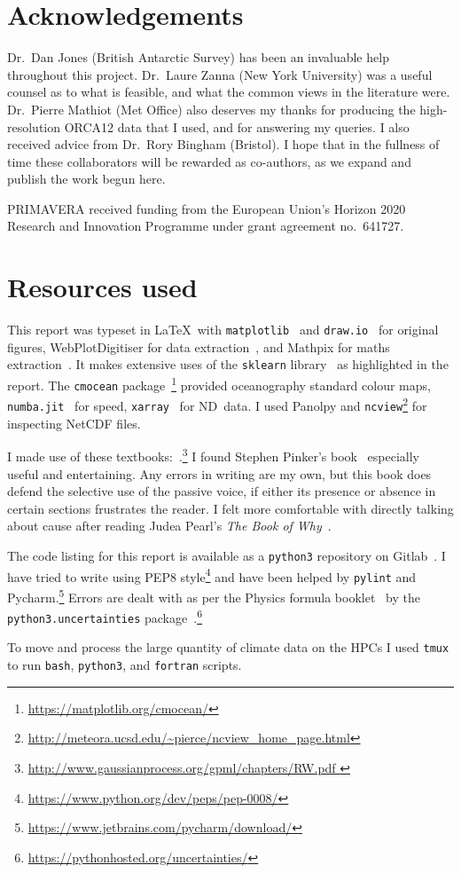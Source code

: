 \section{Acknowledgements}
Dr.\ Dan Jones (British Antarctic Survey) has been an invaluable help throughout this project.
Dr.\ Laure Zanna (New York University) was a useful counsel as to what is feasible,
 and what the common views in the literature were.
Dr.\ Pierre Mathiot (Met Office) also deserves my thanks for
producing the high-resolution ORCA12 data that I used, and
for answering my queries.
I also received advice from Dr.\ Rory Bingham (Bristol).
I hope that in the fullness of time these collaborators will be rewarded
as co-authors, as we expand and publish the
work begun here.

PRIMAVERA received funding from the European Union's Horizon 2020
Research and Innovation Programme under grant agreement no.~641727.


\section{Resources used}

This report was typeset in \LaTeX\
with \texttt{matplotlib}~\cite{Hunter:2007} and \texttt{draw.io}~\cite{DrawIO}
for original figures, WebPlotDigitiser for data extraction~\cite{WebPlotDigitiser},
and Mathpix for maths extraction~\cite{mathpix}.
It makes extensive uses of the \texttt{sklearn} library~\cite{scikit-learn} as highlighted in the report.
The \texttt{cmocean} package~\cite{thyng2016true}\footnote{\url{https://matplotlib.org/cmocean/}}
provided oceanography standard colour maps, \texttt{numba.jit}~\cite{lam2015numba} for speed,
\texttt{xarray}~\cite{hoyer2017xarray} for ND~data.
I used Panolpy and \texttt{ncview}\footnote{\url{http://meteora.ucsd.edu/~pierce/ncview_home_page.html}}
for inspecting NetCDF files.

I made use of these textbooks:~\cite{roisin2010GFD,williams2011ocean,ITILA,
sivia2006data,williams2006gaussian,
}.\footnote{\url{http://www.gaussianprocess.org/gpml/chapters/RW.pdf
}}
I found Stephen Pinker's book~\cite{pinker2015sense} especially useful and entertaining.
Any errors in writing are my own, but this book does defend the selective use of the
passive voice, if either its presence or absence in certain sections frustrates the reader.
I felt more comfortable with directly talking about cause after reading
Judea Pearl's \textit{The Book of Why}~\cite{pearl2018book}.

The code listing for this report is available as a \texttt{python3} repository on Gitlab~\cite{gitlab, skextremes}.
 I have tried to write using PEP8 style\footnote{\url{https://www.python.org/dev/peps/pep-0008/}}
 and have been helped by \texttt{pylint} and Pycharm.\footnote{\url{https://www.jetbrains.com/pycharm/download/}}
 Errors are dealt with as per the Physics formula booklet~\cite{MathsFormulaBooklet}
 by the \texttt{python3.uncertainties}
 package~\cite{lebigot2010uncertainties}.\footnote{\url{https://pythonhosted.org/uncertainties/}}

 To move and process the large quantity of climate data on the HPCs I used \texttt{tmux}
 to run \texttt{bash}, \texttt{python3}, and \texttt{fortran} scripts.
